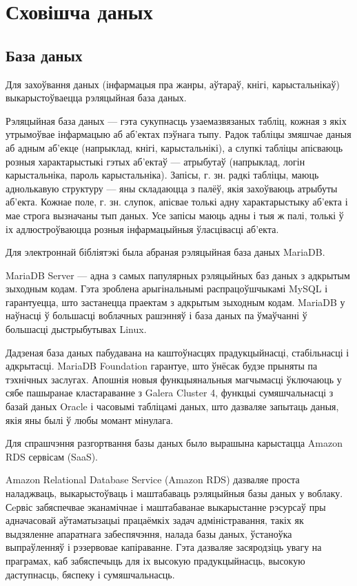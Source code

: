 \section{Сховішча даных}

\subsection{База даных}

Для захоўвання даных (інфармацыя пра жанры, аўтараў, кнігі, карыстальнікаў) выкарыстоўваецца
рэляцыйная база даных.

Рэляцыйная база даных --- гэта сукупнасць узаемазвязаных табліц, кожная з якіх утрымоўвае інфармацыю аб аб'ектах пэўнага тыпу. Радок табліцы змяшчае даныя аб адным аб'екце (напрыклад, кнігі, карыстальнікі), а слупкі табліцы апісваюць розныя характарыстыкі гэтых аб'ектаў --- атрыбутаў (напрыклад, логін карыстальніка, пароль карыстальніка). Запісы, г. зн. радкі табліцы, маюць аднолькавую структуру --- яны складаюцца з палёў, якія захоўваюць атрыбуты аб'екта. Кожнае поле, г. зн. слупок, апісвае толькі адну характарыстыку аб'екта і мае строга вызначаны тып даных. Усе запісы маюць адны і тыя ж палі, толькі ў іх адлюстроўваюцца розныя інфармацыйныя ўласцівасці аб'екта.

Для электроннай бібліятэкі была абраная рэляцыйная база даных MariaDB.

MariaDB Server --- адна з самых папулярных рэляцыйных баз даных з адкрытым зыходным кодам. Гэта зроблена арыгінальнымі распрацоўшчыкамі MySQL і гарантуецца, што застанецца праектам з адкрытым зыходным кодам.
MariaDB у наўнасці ў большасці воблачных рашэнняў і база даных па ўмаўчанні ў большасці дыстрыбутывах Linux.

Дадзеная база даных пабудавана на каштоўнасцях прадукцыйнасці, стабільнасці і адкрытасці. MariaDB Foundation гарантуе, што ўнёсак будзе прыняты па тэхнічных заслугах. Апошнія новыя функцыянальныя магчымасці ўключаюць у сябе пашыранае кластараванне з Galera Cluster 4, функцыі сумяшчальнасці з базай даных Oracle і часовымі табліцамі даных, што дазваляе запытаць даныя, якія яны былі ў любы момант мінулага.

Для спрашчэння разгортвання базы даных было вырашына карыстацца Amazon RDS сервісам (SaaS).

Amazon Relational Database Service (Amazon RDS) дазваляе проста наладжваць, выкарыстоўваць і маштабаваць рэляцыйныя базы даных у воблаку. Сeрвіс забяспечвае эканамічнае і маштабаванае выкарыстанне рэсурсаў пры адначасовай аўтаматызацыі працаёмкіх задач адміністравання, такіх як выдзяленне апаратнага забеспячэння, налада базы даных, ўстаноўка выпраўленняў і рэзервовае капіраванне. Гэта дазваляе засяродзіць увагу на праграмах, каб забяспечыць для іх высокую прадукцыйнасць, высокую даступнасць, бяспеку і сумяшчальнасць.

